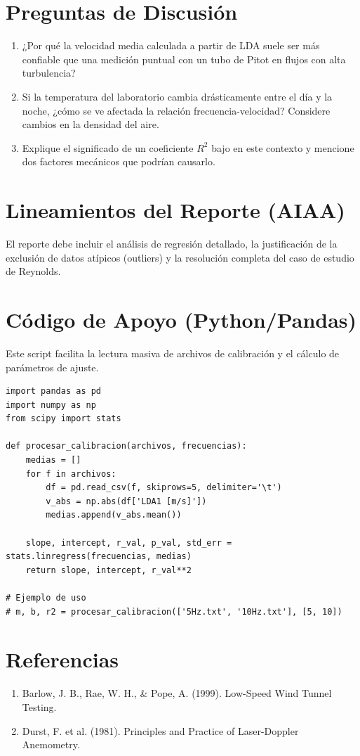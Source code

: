 \documentclass[11pt, a4paper]{article}
\begin{document}
\section{Preguntas de Discusión}
\begin{enumerate}
    \item ¿Por qué la velocidad media calculada a partir de LDA suele ser más confiable que una medición puntual con un tubo de Pitot en flujos con alta turbulencia?
    \item Si la temperatura del laboratorio cambia drásticamente entre el día y la noche, ¿cómo se ve afectada la relación frecuencia-velocidad? Considere cambios en la densidad del aire.
    \item Explique el significado de un coeficiente $R^2$ bajo en este contexto y mencione dos factores mecánicos que podrían causarlo.
\end{enumerate}

\section{Lineamientos del Reporte (AIAA)}
El reporte debe incluir el análisis de regresión detallado, la justificación de la exclusión de datos atípicos (outliers) y la resolución completa del caso de estudio de Reynolds.

\newpage
\appendix
\section{Código de Apoyo (Python/Pandas)}
Este script facilita la lectura masiva de archivos de calibración y el cálculo de parámetros de ajuste.

\begin{lstlisting}
import pandas as pd
import numpy as np
from scipy import stats

def procesar_calibracion(archivos, frecuencias):
    medias = []
    for f in archivos:
        df = pd.read_csv(f, skiprows=5, delimiter='\t')
        v_abs = np.abs(df['LDA1 [m/s]'])
        medias.append(v_abs.mean())
    
    slope, intercept, r_val, p_val, std_err = stats.linregress(frecuencias, medias)
    return slope, intercept, r_val**2

# Ejemplo de uso
# m, b, r2 = procesar_calibracion(['5Hz.txt', '10Hz.txt'], [5, 10])
\end{lstlisting}

\section{Referencias}
\begin{enumerate}
    \item Barlow, J. B., Rae, W. H., \& Pope, A. (1999). Low-Speed Wind Tunnel Testing.
    \item Durst, F. et al. (1981). Principles and Practice of Laser-Doppler Anemometry.
\end{enumerate}
\end{document}
